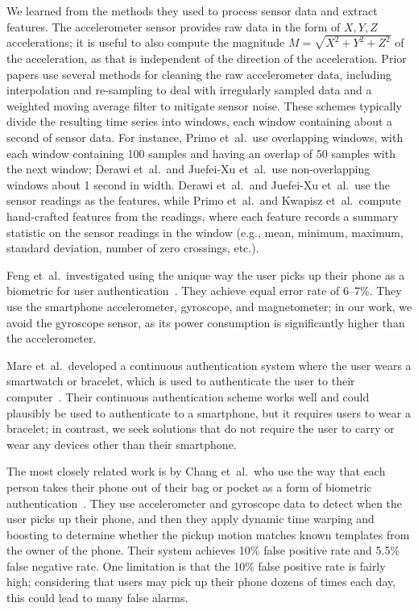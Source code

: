 We learned from the methods they used to process sensor data and extract features.
The accelerometer sensor provides raw data in the form of $X,Y,Z$ accelerations; it is useful to also compute the magnitude $M=\sqrt{X^2+Y^2+Z^2}$ of the acceleration, as that is independent of the direction of the acceleration.
Prior papers use several methods for cleaning the raw accelerometer data, including interpolation and re-sampling to deal with irregularly sampled data and a weighted moving average filter to mitigate sensor noise.
These schemes typically divide the resulting time series into windows, each window containing about a second of sensor data.
For instance, Primo et~al.\ use overlapping windows, with each window containing 100 samples and having an overlap of 50 samples with the next window; Derawi et~al.\ and Juefei-Xu et~al.\ use non-overlapping windows about 1 second in width.
Derawi et~al.\ and Juefei-Xu et~al.\ use the sensor readings as the features, while Primo et~al.\ and Kwapisz et~al.\ compute hand-crafted features from the readings, where each feature records a summary statistic on the sensor readings in the window (e.g., mean, minimum, maximum, standard deviation, number of zero crossings, etc.).

Feng et~al.\ investigated using the unique way the user picks up their phone as a biometric for user authentication~\cite{feng:pickup}. 
They achieve equal error rate of 6--7\%.
They use the smartphone accelerometer, gyroscope, and magnetometer; in our work, we avoid the gyroscope sensor, as its power consumption is significantly higher than the accelerometer.

Mare et~al.\ developed a continuous authentication system where the user wears a smartwatch or bracelet, which is used to authenticate the user to their computer~\cite{mare:zebra}. 
Their continuous authentication scheme works well and could plausibly be used to authenticate to a smartphone, but it requires users to wear a bracelet; in contrast, we seek solutions that do not require the user to carry or wear any devices other than their smartphone.

The most closely related work is by Chang et~al.\, who use the way
that each person takes their phone out of their bag or pocket as a 
form of biometric authentication~\cite{cheng:theft}.
They use accelerometer and gyroscope data to detect when the user picks
up their phone, and then they apply dynamic time warping and boosting to
determine whether the pickup motion matches known templates from the
owner of the phone.
Their system achieves 10\% false positive rate and 5.5\% false negative rate.
One limitation is that the 10\% false positive rate is fairly high;
considering that users may pick up their phone dozens of times each day,
this could lead to many false alarms.

